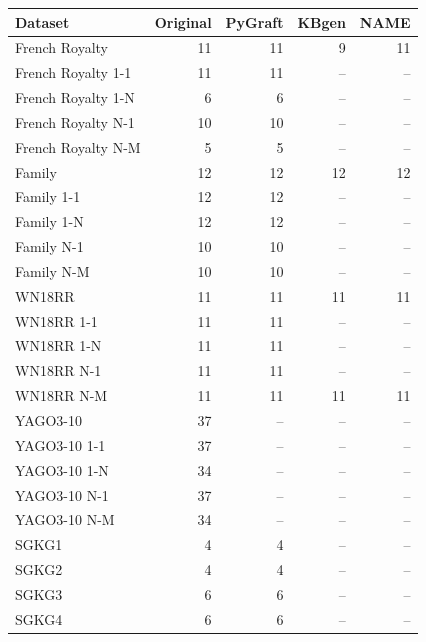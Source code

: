 \begin{tabular}{lrrrr}
\toprule
Dataset & Original & PyGraft & KBgen & NAME \\
\midrule
French Royalty & 11 & 11 & 9 & 11 \\
French Royalty 1-1 & 11 & 11 & – & – \\
French Royalty 1-N & 6 & 6 & – & – \\
French Royalty N-1 & 10 & 10 & – & – \\
French Royalty N-M & 5 & 5 & – & – \\
\midrule
Family & 12 & 12 & 12 & 12 \\
Family 1-1 & 12 & 12 & – & – \\
Family 1-N & 12 & 12 & – & – \\
Family N-1 & 10 & 10 & – & – \\
Family N-M & 10 & 10 & – & – \\
\midrule
WN18RR & 11 & 11 & 11 & 11 \\
WN18RR 1-1 & 11 & 11 & – & – \\
WN18RR 1-N & 11 & 11 & – & – \\
WN18RR N-1 & 11 & 11 & – & – \\
WN18RR N-M & 11 & 11 & 11 & 11 \\
\midrule
YAGO3-10 & 37 & – & – & – \\
YAGO3-10 1-1 & 37 & – & – & – \\
YAGO3-10 1-N & 34 & – & – & – \\
YAGO3-10 N-1 & 37 & – & – & – \\
YAGO3-10 N-M & 34 & – & – & – \\
\midrule
SGKG1 & 4 & 4 & – & – \\
SGKG2 & 4 & 4 & – & – \\
SGKG3 & 6 & 6 & – & – \\
SGKG4 & 6 & 6 & – & – \\
\bottomrule
\end{tabular}
